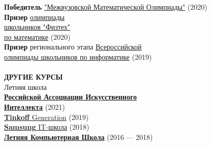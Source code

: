 \documentclass{article}
\begin{document}
\begin{vwcol}[widths={0.8,0.2},
 sep=.8cm, justify=flush,rule=0pt,indent=1em]
\textbf{Победитель} \href{https://olympiads.mccme.ru/ommo/23/}{"Межвузовской Математической Олимпиады"} (2020)\\
\textbf{Призер} \href{https://olymp.mipt.ru/}{олимпиады\\школьников "Физтех"\\по математике} (2020)\\
\textbf{Призер} регионального этапа \href{https://vos.olimpiada.ru/}{Всероссийской\\олимпиады школьников по информатике} (2019)\\
\\
\noindent\textcolor[rgb]{0.1255,0.2902,0.7843}{\textbf{ДРУГИЕ КУРСЫ}}\\
Летняя школа\\\href{https://raai.space/}{\textbf{Российской Ассоциации Искусственного\\Интеллекта}} (2021)\\
\href{https://fintech.tinkoff.ru/school/generation/}{\textbf{Tinkoff} Generation} (2019)\\
\href{https://myitschool.ru/}{\textbf{Samsung} IT-школа} (2018)\\
\href{https://lksh.ru/}{\textbf{Летняя Компьютерная Школа}} (2016 — 2018)\\
\end{vwcol} 
\end{document}
